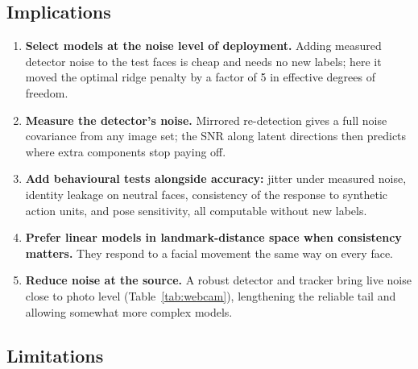 \documentclass[11pt,a4paper]{article}
\begin{document}
\subsection{Implications}

\begin{enumerate}
  \item \textbf{Select models at the noise level of deployment.} Adding measured detector noise to
  the test faces is cheap and needs no new labels; here it moved the optimal ridge penalty by a
  factor of 5 in effective degrees of freedom.
  \item \textbf{Measure the detector's noise.} Mirrored re-detection gives a full noise covariance
  from any image set; the SNR along latent directions then predicts where extra components stop
  paying off.
  \item \textbf{Add behavioural tests alongside accuracy:} jitter under measured noise, identity
  leakage on neutral faces, consistency of the response to synthetic action units, and pose
  sensitivity, all computable without new labels.
  \item \textbf{Prefer linear models in landmark-distance space when consistency matters.} They
  respond to a facial movement the same way on every face.
  \item \textbf{Reduce noise at the source.} A robust detector and tracker bring live noise close to
  photo level (Table~\ref{tab:webcam}), lengthening the reliable tail and allowing somewhat more
  complex models.
\end{enumerate}

\subsection{Limitations}
\end{document}
